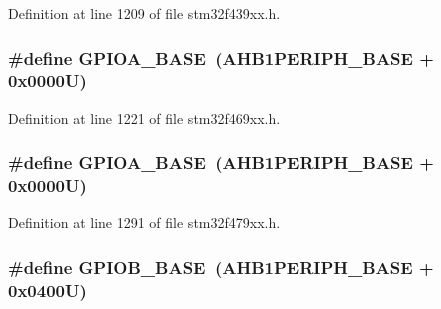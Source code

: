 Definition at line 1209 of file stm32f439xx.\+h.

\subsubsection[{\texorpdfstring{G\+P\+I\+O\+A\+\_\+\+B\+A\+SE}{GPIOA_BASE}}]{\setlength{\rightskip}{0pt plus 5cm}\#define G\+P\+I\+O\+A\+\_\+\+B\+A\+SE~({\bf A\+H\+B1\+P\+E\+R\+I\+P\+H\+\_\+\+B\+A\+SE} + 0x0000\+U)}\hypertarget{group___peripheral__memory__map_gad7723846cc5db8e43a44d78cf21f6efa}{}\label{group___peripheral__memory__map_gad7723846cc5db8e43a44d78cf21f6efa}


Definition at line 1221 of file stm32f469xx.\+h.

\subsubsection[{\texorpdfstring{G\+P\+I\+O\+A\+\_\+\+B\+A\+SE}{GPIOA_BASE}}]{\setlength{\rightskip}{0pt plus 5cm}\#define G\+P\+I\+O\+A\+\_\+\+B\+A\+SE~({\bf A\+H\+B1\+P\+E\+R\+I\+P\+H\+\_\+\+B\+A\+SE} + 0x0000\+U)}\hypertarget{group___peripheral__memory__map_gad7723846cc5db8e43a44d78cf21f6efa}{}\label{group___peripheral__memory__map_gad7723846cc5db8e43a44d78cf21f6efa}


Definition at line 1291 of file stm32f479xx.\+h.

\subsubsection[{\texorpdfstring{G\+P\+I\+O\+B\+\_\+\+B\+A\+SE}{GPIOB_BASE}}]{\setlength{\rightskip}{0pt plus 5cm}\#define G\+P\+I\+O\+B\+\_\+\+B\+A\+SE~({\bf A\+H\+B1\+P\+E\+R\+I\+P\+H\+\_\+\+B\+A\+SE} + 0x0400\+U)}\hypertarget{group___peripheral__memory__map_gac944a89eb789000ece920c0f89cb6a68}{}\label{group___peripheral__memory__map_gac944a89eb789000ece920c0f89cb6a68}


